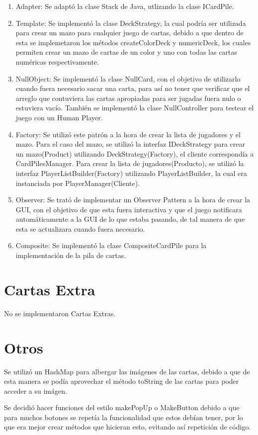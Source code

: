 \documentclass[letterpaper,11pt]{article}
\begin{document}
\begin{enumerate}
\item Adapter: Se adaptó la clase Stack de Java, utlizando la clase ICardPile.

\item Template: Se implementó la clase DeckStrategy, la cual podría ser utilizada para crear un mazo para cualquier juego de cartas, debido a que dentro de esta se implemetaron los métodos createColorDeck y numericDeck, los cuales permiten crear un mazo de cartas de un color y uno con todas las cartas numéricas respectivamente. 

\item NullObject: Se implementó la clase NullCard, con el objetivo de utilizarlo cuando fuera necesario sacar una carta, para así no tener que verificar que el arreglo que contuviera las cartas apropiadas para ser jugadas fuera nulo o estuviera vacío. También se implementó la clase NullController para testear el juego con un Human Player.

\item Factory: Se utilizó este patrón a la hora de crear la lista de jugadores y el mazo. Para el caso del mazo, se utilizó la interfaz IDeckStrategy para crear un mazo(Product) utilizando DeckStrategy(Factory), el cliente correspondía a CardPilesManager.  Para crear la lista de jugadores(Producto), se utilizó la interfaz PlayerListBuilder(Factory) utilizando PlayerListBuilder, la cual era instanciada por PlayerManager(Cliente).

\item Observer: Se trató de implementar un Observer Pattern a la hora de crear la GUI, con el objetivo de que esta fuera interactiva y que el juego notificara automáticamente a la GUI de lo que estaba pasando, de tal manera de que esta se actualizara cuando fuera necesario.

\item Composite: Se implementó la clase CompositeCardPile para la implementación de la pila de cartas.


\end{enumerate}

\section{Cartas Extra}

No se implementaron Cartas Extras.

\section{Otros}

Se utilizó un HashMap para albergar las imágenes de las cartas, debido a que de esta manera se podía aprovechar el método toString de las cartas para poder acceder a su imágen.

Se decidió hacer funciones del estilo makePopUp o MakeButton debido a que para muchos botones se repetía la funcionalidad que estos debían tener, por lo que era mejor crear métodos que hicieran esto, evitando así repetición de código.
\end{document}

